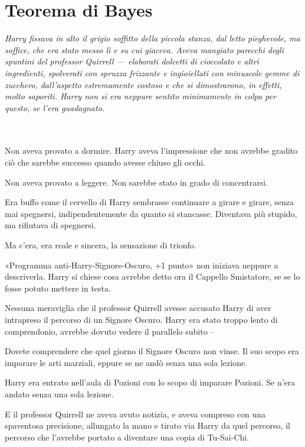 
\chapter{Teorema di Bayes}
\label{capitolo:20}

\emph{Harry fissava in alto il grigio soffitto della piccola stanza, dal letto pieghevole, ma soffice, che era stato messo lì e su cui giaceva. Aveva mangiato parecchi degli spuntini del professor Quirrell — elaborati dolcetti di cioccolato e altri ingredienti, spolverati con spruzza frizzante e ingioiellati con minuscole gemme di zucchero, dall’aspetto estremamente costoso e che si dimostrarono, in effetti, molto saporiti. Harry non si era neppure sentito minimamente in colpa per questo, se l’era guadagnato.}

~\\
~\\


Non aveva provato a dormire. Harry aveva l’impressione che non avrebbe gradito ciò che sarebbe successo quando avesse chiuso gli occhi.

Non aveva provato a leggere. Non sarebbe stato in grado di concentrarsi.

Era buffo come il cervello di Harry sembrasse continuare a girare e girare, senza mai spegnersi, indipendentemente da quanto si stancasse. Diventava più stupido, ma rifiutava di spegnersi.

Ma c’era, era reale e sincera, la sensazione di trionfo.

«Programma anti-Harry-Signore-Oscuro, +1 punto» non iniziava neppure a descriverla. Harry si chiese cosa avrebbe detto ora il Cappello Smistatore, se se lo fosse potuto mettere in testa.

Nessuna meraviglia che il professor Quirrell avesse accusato Harry di aver intrapreso il percorso di un Signore Oscuro. Harry era stato troppo lento di comprendonio, avrebbe dovuto vedere il parallelo subito –

Dovete comprendere che quel giorno il Signore Oscuro non vinse. Il suo scopo era imparare le arti marziali, eppure se ne andò senza una sola lezione.

Harry era entrato nell’aula di Pozioni con lo scopo di imparare Pozioni. Se n’era andato senza una sola lezione.

E il professor Quirrell ne aveva avuto notizia, e aveva compreso con una spaventosa precisione, allungato la mano e tirato via Harry da quel percorso, il percorso che l’avrebbe portato a diventare una copia di Tu-Sai-Chi.

